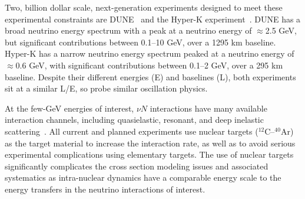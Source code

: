 \documentclass{ar-1col}
\begin{document}
Two, billion dollar scale, next-generation experiments designed to meet these experimental constraints
are
DUNE~\cite{Abi:2020wmh}
and the
Hyper-K experiment~\cite{Hyper-Kamiokande:2018ofw}.
DUNE has a broad neutrino energy spectrum with a peak at a neutrino energy of $\approx$2.5 GeV,
but significant contributions between 0.1--10 GeV, over a 1295 km baseline.
Hyper-K has a narrow neutrino energy spectrum peaked at a neutrino energy of $\approx$0.6 GeV, with significant
contributions between 0.1--2 GeV, over a 295 km baseline. Despite their different energies (E) and
baselines (L), both experiments sit at a similar L/E, so probe similar oscillation physics.%
\begin{marginnote}
\end{marginnote}%
At the few-GeV energies of interest, $\nu N$ interactions have many available interaction channels,
including quasielastic, resonant, and deep inelastic scattering~\cite{zeller12, hayato_review_2014, Mosel:2016cwa, Katori:2016yel, NuSTEC:2017hzk}.
All current and planned experiments use nuclear targets ($^{12}$C--$^{40}$Ar) as the
target material to increase the interaction rate, as well as to avoid serious experimental complications using elementary targets.
The use of nuclear targets significantly complicates the cross section modeling issues and
associated systematics as intra-nuclear dynamics have a comparable energy scale to
the energy transfers in the neutrino interactions of interest.
\end{document}
